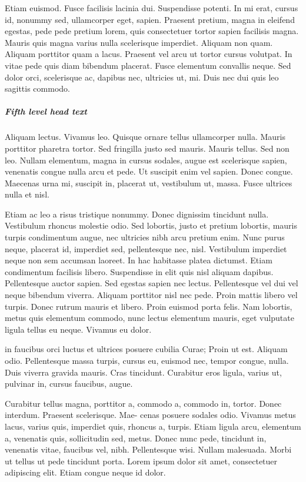 \documentclass[AMS,STIX2COL]{WileyNJD-v2}
\begin{document}
    Etiam euismod. Fusce facilisis lacinia dui. Suspendisse potenti. In mi erat, cursus id, nonummy sed, ullamcorper
    eget, sapien. Praesent pretium, magna in eleifend egestas, pede pede pretium lorem, quis consectetuer tortor sapien
    facilisis magna. Mauris quis magna varius nulla scelerisque imperdiet. Aliquam non quam. Aliquam porttitor quam
    a lacus. Praesent vel arcu ut tortor cursus volutpat. In vitae pede quis diam bibendum placerat. Fusce elementum
    convallis neque. Sed dolor orci, scelerisque ac, dapibus nec, ultricies ut, mi. Duis nec dui quis leo sagittis commodo.

    \subparagraph{Fifth level head text}

    Aliquam lectus. Vivamus leo. Quisque ornare tellus ullamcorper nulla. Mauris porttitor pharetra
    tortor. Sed fringilla justo sed mauris. Mauris tellus. Sed non leo. Nullam elementum, magna in cursus sodales, augue
    est scelerisque sapien, venenatis congue nulla arcu et pede. Ut suscipit enim vel sapien. Donec congue. Maecenas
    urna mi, suscipit in, placerat ut, vestibulum ut, massa. Fusce ultrices nulla et nisl.

    Etiam ac leo a risus tristique nonummy. Donec dignissim tincidunt nulla. Vestibulum rhoncus molestie odio. Sed
    lobortis, justo et pretium lobortis, mauris turpis condimentum augue, nec ultricies nibh arcu pretium enim. Nunc
    purus neque, placerat id, imperdiet sed, pellentesque nec, nisl. Vestibulum imperdiet neque non sem accumsan laoreet.
    In hac habitasse platea dictumst. Etiam condimentum facilisis libero. Suspendisse in elit quis nisl aliquam dapibus.
    Pellentesque auctor sapien. Sed egestas sapien nec lectus. Pellentesque vel dui vel neque bibendum viverra. Aliquam
    porttitor nisl nec pede. Proin mattis libero vel turpis. Donec rutrum mauris et libero. Proin euismod porta felis.
    Nam lobortis, metus quis elementum commodo, nunc lectus elementum mauris, eget vulputate ligula tellus eu neque.
    Vivamus eu dolor.

    in faucibus orci luctus et ultrices posuere cubilia Curae; Proin ut est. Aliquam odio. Pellentesque massa turpis, cursus
    eu, euismod nec, tempor congue, nulla. Duis viverra gravida mauris. Cras tincidunt. Curabitur eros ligula, varius ut,
    pulvinar in, cursus faucibus, augue.

    Curabitur tellus magna, porttitor a, commodo a, commodo in, tortor. Donec interdum. Praesent scelerisque. Mae-
    cenas posuere sodales odio. Vivamus metus lacus, varius quis, imperdiet quis, rhoncus a, turpis. Etiam ligula arcu,
    elementum a, venenatis quis, sollicitudin sed, metus. Donec nunc pede, tincidunt in, venenatis vitae, faucibus vel,
    nibh. Pellentesque wisi. Nullam malesuada. Morbi ut tellus ut pede tincidunt porta. Lorem ipsum dolor sit amet,
    consectetuer adipiscing elit. Etiam congue neque id dolor.
\end{document}

